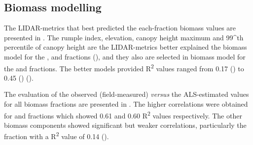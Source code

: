 \subsection{Biomass modelling}\label{sec:carbon:results-modelling}

The LIDAR-metrics that best predicted the each-fraction biomass values are presented in . The rumple index, elevation, canopy height maximum and 99\^{}th percentile of canopy height are the LIDAR-metrics better explained the biomass model for the \ws, \wbs and \wt fractions (), and they also are selected in biomass model for the \wro and \wb fractions. The better models provided R\textsuperscript{2} values ranged from 0.17 (\wb) to 0.45 (\ws) ().

The evaluation of the observed (field-measured) \emph{versus} the ALS-estimated values for all biomass fractions are presented in . The higher correlations were obtained for \ws and \wt fractions which showed 0.61 and 0.60 R\textsuperscript{2} values respectively. The other biomass components showed significant but weaker correlations, particularly the \wbs fraction with a R\textsuperscript{2} value of 0.14 ().

